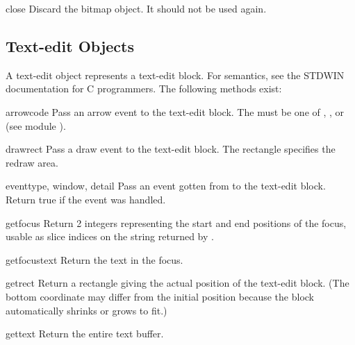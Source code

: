 \begin{funcdesc}{close}{}
Discard the bitmap object.  It should not be used again.
\end{funcdesc}

\subsection{Text-edit Objects}

A text-edit object represents a text-edit block.
For semantics, see the STDWIN documentation for C programmers.
The following methods exist:


\begin{funcdesc}{arrow}{code}
Pass an arrow event to the text-edit block.
The
must be one of
,
,
or
(see module
).
\end{funcdesc}

\begin{funcdesc}{draw}{rect}
Pass a draw event to the text-edit block.
The rectangle specifies the redraw area.
\end{funcdesc}

\begin{funcdesc}{event}{type, window, detail}
Pass an event gotten from
to the text-edit block.
Return true if the event was handled.
\end{funcdesc}

\begin{funcdesc}{getfocus}{}
Return 2 integers representing the start and end positions of the
focus, usable as slice indices on the string returned by
.
\end{funcdesc}

\begin{funcdesc}{getfocustext}{}
Return the text in the focus.
\end{funcdesc}

\begin{funcdesc}{getrect}{}
Return a rectangle giving the actual position of the text-edit block.
(The bottom coordinate may differ from the initial position because
the block automatically shrinks or grows to fit.)
\end{funcdesc}

\begin{funcdesc}{gettext}{}
Return the entire text buffer.
\end{funcdesc}

